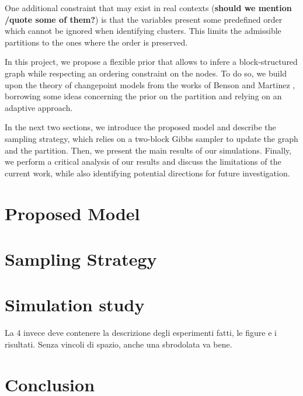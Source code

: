 One additional constraint that may exist in real contexts (\textbf{should we mention /quote some of them?}) is that the variables present some predefined order which cannot be ignored when identifying clusters. This limits the admissible partitions to the ones where the order is preserved.

In this project, we propose a flexible prior that allows to infere a block-structured graph while respecting an ordering constraint on the nodes. To do so, we build upon the theory of changepoint models from the works of Benson \cite{bensonAdaptiveMCMCMultiple2018} and Martinez \cite{martinezNonparametricChangePoint2014}, borrowing some ideas concerning the prior on the partition and relying on an adaptive approach. 

In the next two sections, we introduce the proposed model and describe the sampling strategy, which relies on a two-block Gibbs sampler to update the graph and the partition. Then, we present the main results of our simulations. Finally, we perform a critical analysis of our results and discuss the limitations of the current work, while also identifying potential directions for future investigation.  


\section{Proposed Model}


\section{Sampling Strategy}


\section{Simulation study}

La 4 invece deve contenere la descrizione degli esperimenti fatti, le figure e i risultati. Senza vincoli di spazio, anche una sbrodolata va bene.


\section{Conclusion}

